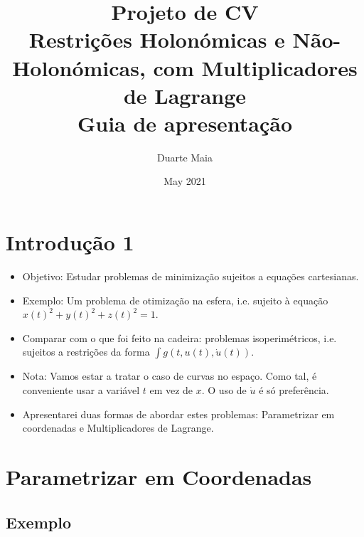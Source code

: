 \documentclass{article}
\title{Projeto de CV\\
\large Restrições Holonómicas e Não-Holonómicas, com Multiplicadores de Lagrange\\
Guia de apresentação}
\author{Duarte Maia}
\date{May 2021}
\theoremstyle{plain}
\theoremstyle{plain}
\theoremstyle{nonumberplain}
\theoremstyle{empty}
\begin{document}
\maketitle

\section{Introdução 1}

\begin{itemize}
\item Objetivo: Estudar problemas de minimização sujeitos a equações cartesianas.

\item Exemplo: Um problema de otimização na esfera, i.e. sujeito à equação $x(t)^2 + y(t)^2 + z(t)^2 = 1$.

\item Comparar com o que foi feito na cadeira: problemas isoperimétricos, i.e. sujeitos a restrições da forma $\int g(t,u(t),\dot u(t))$.

\item Nota: Vamos estar a tratar o caso de curvas no espaço. Como tal, é conveniente usar a variável $t$ em vez de $x$. O uso de $\dot u$ é só preferência.

\item Apresentarei duas formas de abordar estes problemas: Parametrizar em coordenadas e Multiplicadores de Lagrange.
\end{itemize}

\section{Parametrizar em Coordenadas}

\subsection{Exemplo}
\end{document}
